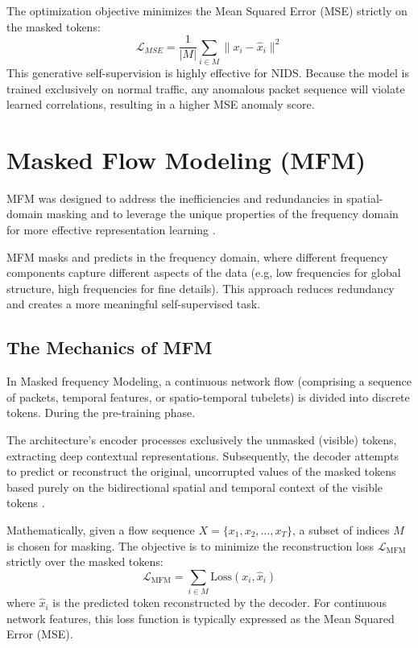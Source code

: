 \documentclass[12pt, a4paper]{report}
\begin{document}
The optimization objective minimizes the Mean Squared Error (MSE) strictly on the masked tokens:
\begin{equation}
\mathcal{L}_{MSE} = \frac{1}{|M|} \sum_{i \in M} \| x_i - \hat{x}_i \|^2
\label{eq:mae_loss} 
\end{equation}
This generative self-supervision is highly effective for NIDS. Because the model is trained exclusively on normal traffic, any anomalous packet sequence will violate learned correlations, resulting in a higher MSE anomaly score.


\section{Masked Flow Modeling (MFM)}
\label{sec:mfm}

MFM was designed to address the inefficiencies and redundancies in spatial-domain masking and to leverage the unique properties of the frequency domain for more effective representation learning \cite{xie2023mfm}.

 MFM masks and predicts in the frequency domain, where different frequency components capture different aspects of the data (e.g, low frequencies for global structure, high frequencies for fine details). This approach reduces redundancy and creates a more meaningful self-supervised task.

\subsection{The Mechanics of MFM}
In Masked frequency Modeling, a continuous network flow (comprising a sequence of packets, temporal features, or spatio-temporal tubelets) is divided into discrete tokens. During the pre-training phase. 

The architecture's encoder processes exclusively the unmasked (visible) tokens, extracting deep contextual representations. Subsequently, the decoder attempts to predict or reconstruct the original, uncorrupted values of the masked tokens based purely on the bidirectional spatial and temporal context of the visible tokens \cite{xie2023mfm}.

Mathematically, given a flow sequence $X = \{x_1, x_2, \dots, x_T\}$, a subset of indices $M$ is chosen for masking. The objective is to minimize the reconstruction loss $\mathcal{L}_{\text{MFM}}$ strictly over the masked tokens:
\begin{equation}
\mathcal{L}_{\text{MFM}} = \sum_{i \in M} \text{Loss}(x_i, \hat{x}_i)
\end{equation}
where $\hat{x}_i$ is the predicted token reconstructed by the decoder. For continuous network features, this loss function is typically expressed as the Mean Squared Error (MSE).
\end{document}
